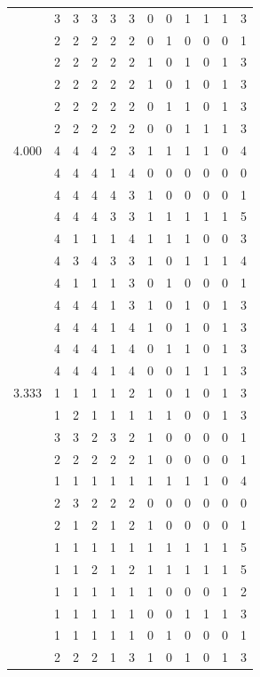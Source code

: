 \documentclass[]{book}
\theoremstyle{definition}
\theoremstyle{definition}
\theoremstyle{definition}
\theoremstyle{remark}
\begin{document}
\begin{table}
{\begin{tabular}[t]{rrrrrrrrrrrr}
 & 3 & 3 & 3 & 3 & 3 & 0 & 0 & 1 & 1 & 1 & 3\\
 & 2 & 2 & 2 & 2 & 2 & 0 & 1 & 0 & 0 & 0 & 1\\
 & 2 & 2 & 2 & 2 & 2 & 1 & 0 & 1 & 0 & 1 & 3\\
 & 2 & 2 & 2 & 2 & 2 & 1 & 0 & 1 & 0 & 1 & 3\\
 & 2 & 2 & 2 & 2 & 2 & 0 & 1 & 1 & 0 & 1 & 3\\
 & 2 & 2 & 2 & 2 & 2 & 0 & 0 & 1 & 1 & 1 & 3\\
4.000 & 4 & 4 & 4 & 2 & 3 & 1 & 1 & 1 & 1 & 0 & 4\\
 & 4 & 4 & 4 & 1 & 4 & 0 & 0 & 0 & 0 & 0 & 0\\
 & 4 & 4 & 4 & 4 & 3 & 1 & 0 & 0 & 0 & 0 & 1\\
 & 4 & 4 & 4 & 3 & 3 & 1 & 1 & 1 & 1 & 1 & 5\\
 & 4 & 1 & 1 & 1 & 4 & 1 & 1 & 1 & 0 & 0 & 3\\
 & 4 & 3 & 4 & 3 & 3 & 1 & 0 & 1 & 1 & 1 & 4\\
 & 4 & 1 & 1 & 1 & 3 & 0 & 1 & 0 & 0 & 0 & 1\\
 & 4 & 4 & 4 & 1 & 3 & 1 & 0 & 1 & 0 & 1 & 3\\
 & 4 & 4 & 4 & 1 & 4 & 1 & 0 & 1 & 0 & 1 & 3\\
 & 4 & 4 & 4 & 1 & 4 & 0 & 1 & 1 & 0 & 1 & 3\\
 & 4 & 4 & 4 & 1 & 4 & 0 & 0 & 1 & 1 & 1 & 3\\
3.333 & 1 & 1 & 1 & 1 & 2 & 1 & 0 & 1 & 0 & 1 & 3\\
 & 1 & 2 & 1 & 1 & 1 & 1 & 1 & 0 & 0 & 1 & 3\\
 & 3 & 3 & 2 & 3 & 2 & 1 & 0 & 0 & 0 & 0 & 1\\
 & 2 & 2 & 2 & 2 & 2 & 1 & 0 & 0 & 0 & 0 & 1\\
 & 1 & 1 & 1 & 1 & 1 & 1 & 1 & 1 & 1 & 0 & 4\\
 & 2 & 3 & 2 & 2 & 2 & 0 & 0 & 0 & 0 & 0 & 0\\
 & 2 & 1 & 2 & 1 & 2 & 1 & 0 & 0 & 0 & 0 & 1\\
 & 1 & 1 & 1 & 1 & 1 & 1 & 1 & 1 & 1 & 1 & 5\\
 & 1 & 1 & 2 & 1 & 2 & 1 & 1 & 1 & 1 & 1 & 5\\
 & 1 & 1 & 1 & 1 & 1 & 1 & 0 & 0 & 0 & 1 & 2\\
 & 1 & 1 & 1 & 1 & 1 & 0 & 0 & 1 & 1 & 1 & 3\\
 & 1 & 1 & 1 & 1 & 1 & 0 & 1 & 0 & 0 & 0 & 1\\
 & 2 & 2 & 2 & 1 & 3 & 1 & 0 & 1 & 0 & 1 & 3\\

\end{tabular}}
\end{table}
\end{document}
